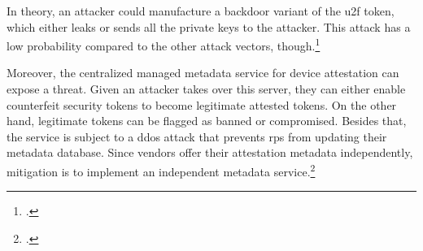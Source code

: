 In theory, an attacker could manufacture a backdoor variant of the \gls{u2f} token, which either leaks or sends all the private keys to the attacker. This attack has a low probability compared to the other attack vectors, though.\footcites[See][3]{DBLP:journals/corr/abs-1810-04660}

Moreover, the centralized managed metadata service for device attestation can expose a threat. Given an attacker takes over this server, they can either enable counterfeit security tokens to become legitimate attested tokens. On the other hand, legitimate tokens can be flagged as banned or compromised. Besides that, the service is subject to a \gls{ddos} attack that prevents \glspl{rp} from updating their metadata database. Since vendors offer their attestation metadata independently, mitigation is to implement an independent metadata service.\footcites[See][]{fido-metadata}[See][17]{Chang2017OnMU}
